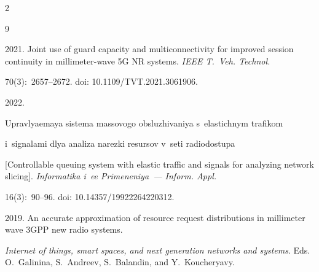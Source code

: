   \begin{multicols}{2}



\renewcommand{\bibname}{\protect\rmfamily References}




{\small\frenchspacing

 {\baselineskip=10.8pt


 \begin{thebibliography}{9} 



 2021. Joint use of guard capacity and multiconnectivity for improved session continuity in millimeter-wave 5G NR systems. \textit{IEEE T.~Veh. Technol.}

  70(3):~2657--2672. doi: 10.1109/TVT.2021.3061906.




 2022. 

Up\-rav\-lya\-emaya sis\-te\-ma mas\-so\-vo\-go ob\-slu\-zhi\-va\-niya s~elas\-tich\-nym tra\-fi\-kom 

i~sig\-na\-la\-mi dlya ana\-li\-za na\-rez\-ki re\-sur\-sov v~se\-ti ra\-dio\-do\-stu\-pa 

[Controllable queuing system with elastic traffic and signals for analyzing network slicing]. \textit{Informatika i~ee Primeneniya~--- Inform. Appl.} 

16(3):~90--96. doi: 10.14357/19922264220312.





 2019. An accurate approximation of resource request distributions in millimeter wave 3GPP new radio systems. 

 \textit{Internet of things, smart spaces, and next generation networks and systems}. Eds. O.~Galinina, S.~Andreev, S.~Balandin, and Y.~Koucheryavy. 


\end{thebibliography}}}
\end{multicols}
